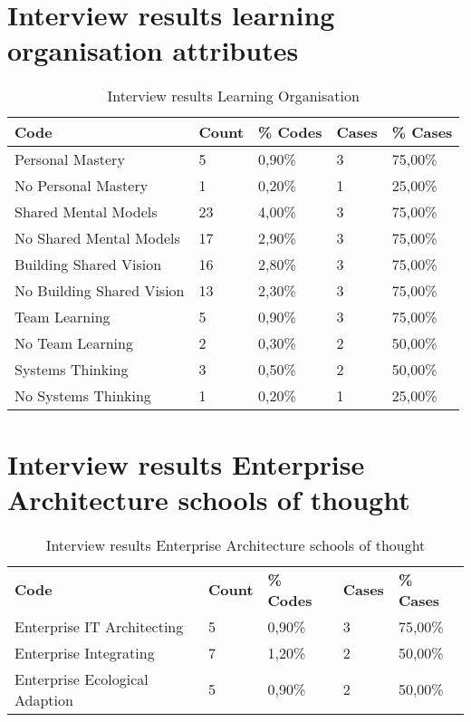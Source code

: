 \section{Interview results learning organisation attributes}
\label{sec:interviewresultslearningorganisation}
\begin{table}[H]
	\centering
	\begin{tabular}{lllll}
		\toprule
		\textbf{Code} & \textbf{Count} & \textbf{\% Codes} & \textbf{Cases} & \textbf{\% Cases} \\
		\midrule
		Personal Mastery & 5     & 0,90\% & 3     & 75,00\% \\
		No Personal Mastery & 1     & 0,20\% & 1     & 25,00\% \\
		Shared Mental Models & 23    & 4,00\% & 3     & 75,00\% \\
		No Shared Mental Models & 17    & 2,90\% & 3     & 75,00\% \\
		Building Shared Vision & 16    & 2,80\% & 3     & 75,00\% \\
		No Building Shared Vision & 13    & 2,30\% & 3     & 75,00\% \\
		Team Learning & 5     & 0,90\% & 3     & 75,00\% \\
		No Team Learning & 2     & 0,30\% & 2     & 50,00\% \\
		Systems Thinking & 3     & 0,50\% & 2     & 50,00\% \\
		No Systems Thinking & 1     & 0,20\% & 1     & 25,00\% \\
		\bottomrule
	\end{tabular}%
	\caption{Interview results Learning Organisation}%
	\label{tab:interviewresultslearningorganisation}%
\end{table}%

\section{Interview results Enterprise Architecture schools of thought}
\label{sec:interviewresultseaschoolsofthought}
\begin{table}[H]
	\centering
	\begin{tabular}{lllll}
		\toprule
		\textbf{Code} & \textbf{Count} & \textbf{\% Codes} & \textbf{Cases} & \textbf{\% Cases} \\
		Enterprise IT Architecting & 5     & 0,90\% & 3     & 75,00\% \\
		Enterprise Integrating & 7     & 1,20\% & 2     & 50,00\% \\
		Enterprise Ecological Adaption & 5     & 0,90\% & 2     & 50,00\% \\
		\bottomrule
	\end{tabular}%
	\caption{Interview results Enterprise Architecture schools of thought}%
	\label{tab:interviewresultseaschools}%
\end{table}%

